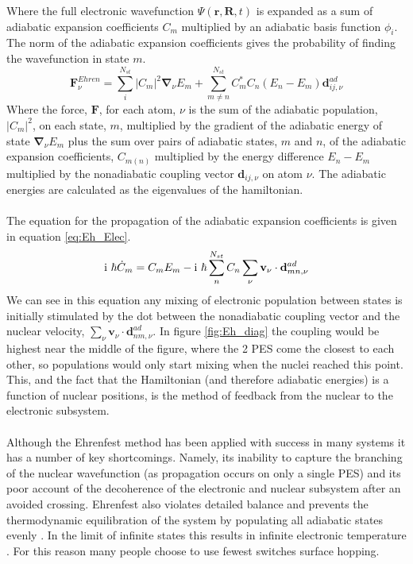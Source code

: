 Where the full electronic wavefunction $\Psi(\mathbf{r}, \mathbf{R}, t)$ is expanded as a sum of adiabatic expansion coefficients $C_{m}$ multiplied by an adiabatic basis function $\phi_i$. The norm of the adiabatic expansion coefficients gives the probability of finding the wavefunction in state $m$.
\begin{equation}
  \mathbf{F}_{\nu}^{Ehren} = \sum_i^{N_{st}} |C_{m}|^2 \mathbf{\nabla}_{\nu} E_{m} + \sum_{m \neq n}^{N_{st}} C_{m}^{*} C_{n} (E_{n} - E_{m}) \mathbf{d}_{ij, \nu}^{ad}
  \label{eq:Eh_Force}
\end{equation}
Where the force, $\mathbf{F}$, for each atom, $\nu$ is the sum of the adiabatic population, $|C_{m}|^2$, on each state, $m$, multiplied by the gradient of the adiabatic energy of state $\mathbf{\nabla}_{\nu}E_{m}$ plus the sum over pairs of adiabatic states, $m$ and $n$, of the adiabatic expansion coefficients, $C_{m (n)}$ multiplied by the energy difference $E_{n} - E_{m}$ multiplied by the nonadiabatic coupling vector $\mathbf{d}_{ij, \nu}$ on atom $\nu$. The adiabatic energies are calculated as the eigenvalues of the hamiltonian.
\\\\
The equation for the propagation of the adiabatic expansion coefficients is given in equation \eqref{eq:Eh_Elec}.
\begin{equation}
  \im \ \hbar \dot{C}_{m} = C_{m}E_{m} -  \im \ \hbar  \sum_{n}^{N_{st}} C_{n} \sum_{\nu} \mathbf{v}_{\nu} \cdot \mathbf{d}^{ad}_{mn, \nu}
  \label{eq:Eh_Elec}
\end{equation}
We can see in this equation any mixing of electronic population between states is initially stimulated by the dot between the nonadiabatic coupling vector and the nuclear velocity, $\sum_{\nu} \mathbf{v}_{\nu} \cdot \mathbf{d}_{nm, \nu}^{ad}$. In figure \ref{fig:Eh_diag} the coupling would be highest near the middle of the figure, where the 2 PES come the closest to each other, so populations would only start mixing when the nuclei reached this point. This, and the fact that the Hamiltonian (and therefore adiabatic energies) is a function of nuclear positions, is the method of feedback from the nuclear to the electronic subsystem. 
\\\\
Although the Ehrenfest method has been applied with success in many systems \cite{Li2005Aug, Saita2012Dec, Kohen1998Sep} it has a number of key shortcomings. Namely, its inability to capture the branching of the nuclear wavefunction (as propagation occurs on only a single PES) and its poor account of the decoherence of the electronic and nuclear subsystem after an avoided crossing. Ehrenfest also violates detailed balance and prevents the thermodynamic equilibration of the system by populating all adiabatic states evenly \cite{tully_perspective:_2012, john_c._tully_nonadiabatic_nodate}. In the limit of infinite states this results in infinite electronic temperature \cite{parandekar_detailed_2006}. For this reason many people choose to use fewest switches surface hopping.

